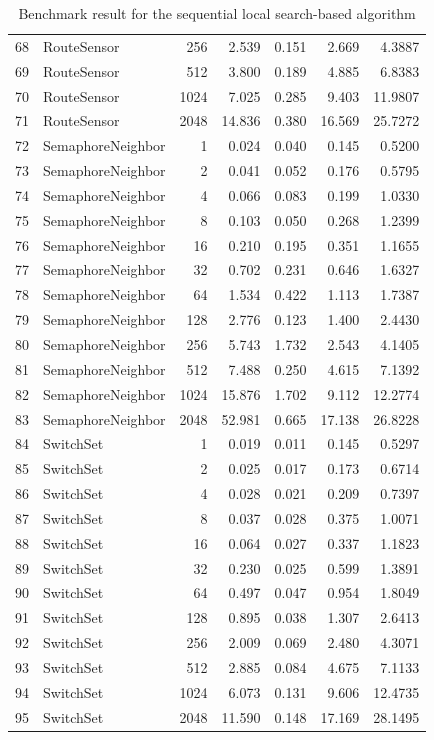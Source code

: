 \begin{table}[ht]
\begin{tabular}{rlrrrrr}
		68 & RouteSensor & 256 & 2.539 & 0.151 & 2.669 & 4.3887 \\ 
		69 & RouteSensor & 512 & 3.800 & 0.189 & 4.885 & 6.8383 \\ 
		70 & RouteSensor & 1024 & 7.025 & 0.285 & 9.403 & 11.9807 \\ 
		71 & RouteSensor & 2048 & 14.836 & 0.380 & 16.569 & 25.7272 \\ 
		\hline
		72 & SemaphoreNeighbor & 1 & 0.024 & 0.040 & 0.145 & 0.5200 \\ 
		73 & SemaphoreNeighbor & 2 & 0.041 & 0.052 & 0.176 & 0.5795 \\ 
		74 & SemaphoreNeighbor & 4 & 0.066 & 0.083 & 0.199 & 1.0330 \\ 
		75 & SemaphoreNeighbor & 8 & 0.103 & 0.050 & 0.268 & 1.2399 \\ 
		76 & SemaphoreNeighbor & 16 & 0.210 & 0.195 & 0.351 & 1.1655 \\ 
		77 & SemaphoreNeighbor & 32 & 0.702 & 0.231 & 0.646 & 1.6327 \\ 
		78 & SemaphoreNeighbor & 64 & 1.534 & 0.422 & 1.113 & 1.7387 \\ 
		79 & SemaphoreNeighbor & 128 & 2.776 & 0.123 & 1.400 & 2.4430 \\ 
		80 & SemaphoreNeighbor & 256 & 5.743 & 1.732 & 2.543 & 4.1405 \\ 
		81 & SemaphoreNeighbor & 512 & 7.488 & 0.250 & 4.615 & 7.1392 \\ 
		82 & SemaphoreNeighbor & 1024 & 15.876 & 1.702 & 9.112 & 12.2774 \\ 
		83 & SemaphoreNeighbor & 2048 & 52.981 & 0.665 & 17.138 & 26.8228 \\ 
		\hline
		84 & SwitchSet & 1 & 0.019 & 0.011 & 0.145 & 0.5297 \\ 
		85 & SwitchSet & 2 & 0.025 & 0.017 & 0.173 & 0.6714 \\ 
		86 & SwitchSet & 4 & 0.028 & 0.021 & 0.209 & 0.7397 \\ 
		87 & SwitchSet & 8 & 0.037 & 0.028 & 0.375 & 1.0071 \\ 
		88 & SwitchSet & 16 & 0.064 & 0.027 & 0.337 & 1.1823 \\ 
		89 & SwitchSet & 32 & 0.230 & 0.025 & 0.599 & 1.3891 \\ 
		90 & SwitchSet & 64 & 0.497 & 0.047 & 0.954 & 1.8049 \\ 
		91 & SwitchSet & 128 & 0.895 & 0.038 & 1.307 & 2.6413 \\ 
		92 & SwitchSet & 256 & 2.009 & 0.069 & 2.480 & 4.3071 \\ 
		93 & SwitchSet & 512 & 2.885 & 0.084 & 4.675 & 7.1133 \\ 
		94 & SwitchSet & 1024 & 6.073 & 0.131 & 9.606 & 12.4735 \\ 
		95 & SwitchSet & 2048 & 11.590 & 0.148 & 17.169 & 28.1495 \\ 
		\hline
	\end{tabular}
	\caption{Benchmark result for the sequential local search-based algorithm}
		\label{tab:tb-seq}
\end{table}


